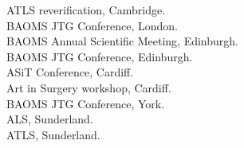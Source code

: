  ATLS reverification, Cambridge. \\
 BAOMS JTG Conference, London. \\
 BAOMS Annual Scientific Meeting, Edinburgh. \\
 BAOMS JTG Conference, Edinburgh. \\
 ASiT Conference, Cardiff. \\
 Art in Surgery workshop, Cardiff. \\
 BAOMS JTG Conference, York. \\
 ALS, Sunderland. \\
 ATLS, Sunderland. \\



